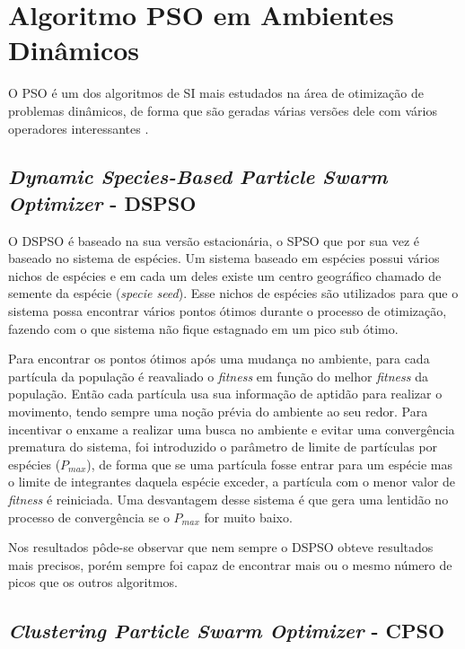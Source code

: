 \section{Algoritmo PSO em Ambientes Dinâmicos}
\label{sec:pso_behaviour}

O PSO é um dos algoritmos de SI mais estudados na área de otimização de problemas dinâmicos, de forma que são geradas várias versões dele com vários operadores interessantes \cite{carlisle2002applying}.

\subsection{\textit{Dynamic Species-Based Particle Swarm Optimizer} - DSPSO}
\label{sec:dspso}

O DSPSO \cite{parrott2006locating} é baseado na sua versão estacionária, o SPSO que por sua vez é baseado no sistema de espécies. Um sistema baseado em espécies possui vários nichos de espécies e em cada um deles existe um centro geográfico chamado de semente da espécie (\textit{specie seed}). Esse nichos de espécies são utilizados para que o sistema possa encontrar vários pontos ótimos durante o processo de otimização, fazendo com o que sistema não fique estagnado em um pico sub ótimo.

Para encontrar os pontos ótimos após uma mudança no ambiente, para cada partícula da população é reavaliado o \textit{fitness} em função do melhor \textit{fitness} da população. Então cada partícula usa sua informação de aptidão para realizar o movimento, tendo sempre uma noção prévia do ambiente ao seu redor. Para incentivar o enxame a realizar uma busca no ambiente e evitar uma convergência prematura do sistema, foi introduzido o parâmetro de limite de partículas por espécies ($P_{max}$), de forma que se uma partícula fosse entrar para um espécie mas o limite de integrantes daquela espécie exceder, a partícula com o menor valor de \textit{fitness} é reiniciada. Uma desvantagem desse sistema é que gera uma lentidão no processo de convergência se o $P_{max}$ for muito baixo.

Nos resultados pôde-se observar que nem sempre o DSPSO obteve resultados mais precisos, porém sempre foi capaz de encontrar mais ou o mesmo número de picos que os outros algoritmos.

\subsection{\textit{Clustering Particle Swarm Optimizer} - CPSO}
\label{sec:cpso}

